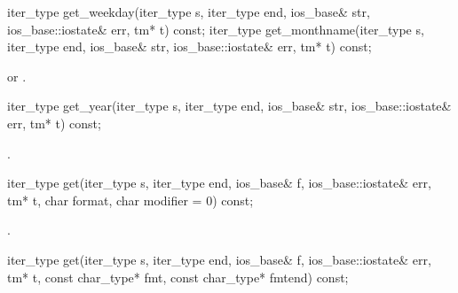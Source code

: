%
%
\begin{itemdecl}
iter_type get_weekday(iter_type s, iter_type end, ios_base& str,
                      ios_base::iostate& err, tm* t) const;
iter_type get_monthname(iter_type s, iter_type end, ios_base& str,
                        ios_base::iostate& err, tm* t) const;
\end{itemdecl}

\begin{itemdescr}
\pnum
\returns
{}
or
.
\end{itemdescr}

%
\begin{itemdecl}
iter_type get_year(iter_type s, iter_type end, ios_base& str,
                   ios_base::iostate& err, tm* t) const;
\end{itemdecl}

\begin{itemdescr}
\pnum
\returns
{}.
\end{itemdescr}

%
\begin{itemdecl}
iter_type get(iter_type s, iter_type end, ios_base& f, ios_base::iostate& err,
              tm* t, char format, char modifier = 0) const;
\end{itemdecl}

\begin{itemdescr}
\pnum
\returns
{}.
\end{itemdescr}

%
\begin{itemdecl}
iter_type get(iter_type s, iter_type end, ios_base& f, ios_base::iostate& err,
              tm* t, const char_type* fmt, const char_type* fmtend) const;
\end{itemdecl}

